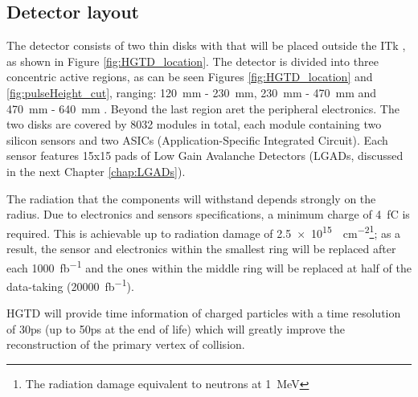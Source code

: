 \subsection{Detector layout}\label{subsec:HGTD_layout}

The detector consists of two thin disks with that will be placed outside the ITk , as shown in Figure \ref{fig:HGTD_location}. The detector is divided into three concentric active regions, as can be seen Figures \ref{fig:HGTD_location} and \ref{fig:pulseHeight_cut}, ranging: \qty{120}{\milli\meter} - \qty{230}{\milli\meter}, \qty{230}{\milli\meter} - \qty{470}{\milli\meter} and  \qty{470}{\milli\meter} - \qty{640}{\milli\meter} \cite{CERN-LHCC-2020-007}. Beyond the last region aret the peripheral electronics. The two disks are covered by 8032 modules in total, each module containing two silicon sensors and two ASICs (Application-Specific Integrated Circuit). Each sensor features 15x15 pads of Low Gain Avalanche Detectors (LGADs, discussed in the next Chapter \ref{chap:LGADs}).

The radiation that the components will withstand depends strongly on the radius. Due to electronics and sensors specifications, a minimum charge of \qty{4}{\femto\coulomb} is required. This is achievable up to radiation damage of \qty{2.5e15}{\neutroneq\centi\meter^{-2}}\footnote{The radiation damage equivalent to neutrons at \qty{1}{\mega\electronvolt} }; as a result, the sensor and electronics within the smallest ring will be replaced after each \qty{1000}{\femto\barn^{-1}} and the ones within the middle ring will be replaced at half of the data-taking (\qty{20000}{\femto\barn^{-1}}). 


HGTD will provide time information of charged particles with a time resolution of 30ps (up to 50ps at the end of life) which will greatly improve the reconstruction of the primary vertex of collision. 



